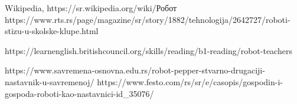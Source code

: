 \documentclass[a4paper]{article}
\begin{document}
\newpage
{}
\appendix

\begin{thebibliography}{9}

\bibitem{} Wikipedia, https://sr.wikipedia.org/wiki/Робот
\bibitem{}https://www.rts.rs/page/magazine/sr/story/1882/tehnologija/2642727/roboti-stizu-u-skolske-klupe.html

\bibitem{} https://learnenglish.britishcouncil.org/skills/reading/b1-reading/robot-teachers

\bibitem{}https://www.savremena-osnovna.edu.rs/robot-pepper-stvarno-drugaciji-nastavnik-u-savremenoj/
\bibitem{}https://www.festo.com/rs/sr/e/casopis/gospodin-i-gospoda-roboti-kao-nastavnici-id\_35076/


\end{thebibliography}
\end{document}

